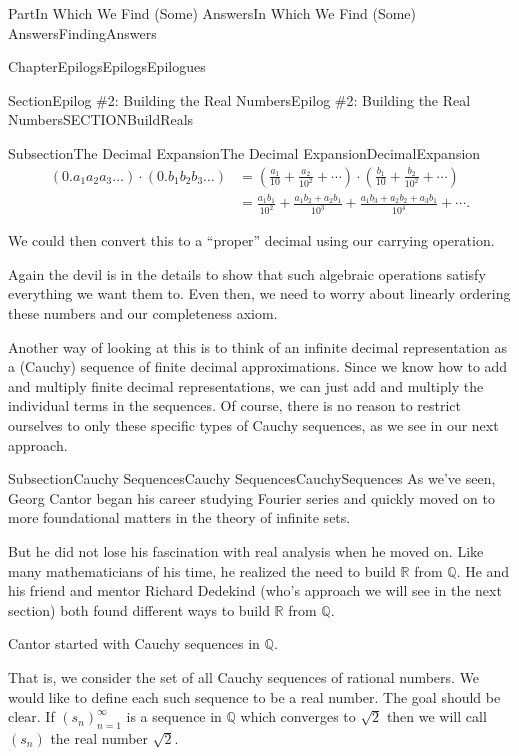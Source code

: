 \documentclass[oneside,10pt,]{book}
\numberwithin{equation}{part}
\newcommand{\RR}{\mathbb {R}}
\newcommand{\QQ}{\mathbb {Q}}
\newcommand{\amp}{&}
\begin{document}
\begin{partptx}{Part}{In Which We Find (Some) Answers}{}{In Which We Find (Some) Answers}{}{}{FindingAnswers}
\begin{chapterptx}{Chapter}{Epilogs}{}{Epilogs}{}{}{Epilogues}
\begin{sectionptx}{Section}{Epilog \#2: Building the Real Numbers}{}{Epilog \#2: Building the Real Numbers}{}{}{SECTIONBuildReals}
\begin{subsectionptx}{Subsection}{The Decimal Expansion}{}{The Decimal Expansion}{}{}{DecimalExpansion}
\begin{align*}
(0.a_1a_2a_3\ldots)\cdot(0.b_1b_2b_3\ldots) \amp =\left(\frac{a_1}{10}+\frac{a_2}{10^2}+\cdots\right) \cdot\left(\frac{b_1}{10}+\frac{b_2}{10^2}+\cdots\right)\\
\amp =\frac{a_1b_1}{10^2}+\frac{a_1b_2+a_2b_1}{10^3}+\frac{a_1b_3+a_2b_2+a_3b_1}{10^4}+\cdots\text{.}
\end{align*}
%
\par
We could then convert this to a ``proper'' decimal using our carrying operation.%
\par
Again the devil is in the details to show that such algebraic operations satisfy everything we want them to. Even then, we need to worry about linearly ordering these numbers and our completeness axiom.%
\par
Another way of looking at this is to think of an infinite decimal representation as a (Cauchy) sequence of finite decimal approximations.  Since we know how to add and multiply finite decimal representations, we can just add and multiply the individual terms in the sequences.  Of course, there is no reason to restrict ourselves to only these specific types of Cauchy sequences, as we see in our next approach.%
\end{subsectionptx}
%
%
\typeout{************************************************}
\typeout{************************************************}
%
\begin{subsectionptx}{Subsection}{Cauchy Sequences}{}{Cauchy Sequences}{}{}{CauchySequences}
 As we've seen, Georg Cantor began his career studying Fourier series and quickly moved on to more foundational matters in the theory of infinite sets.%
\par
{} But he did not lose his fascination with real analysis when he moved on.  Like many mathematicians of his time, he realized the need to build \(\RR\) from \(\QQ\).  He and his friend and mentor Richard Dedekind  (who's approach we will see in the next section) both found different ways to build \(\RR\) from \(\QQ\).%
\par
Cantor started with Cauchy sequences in \(\QQ\).%
\par
That is, we consider the set of all Cauchy sequences of rational numbers.  We would like to define each such sequence to be a real number.  The goal should be clear.  If \(\left(s_n\right)_{n=1}^\infty\) is a sequence in \(\QQ\) which converges to \(\sqrt{2}\) then we will call \(\left(s_n\right)\) the real number \(\sqrt{2}\).%

\end{subsectionptx}
\end{sectionptx}
\end{chapterptx}
\end{partptx}
\end{document}
